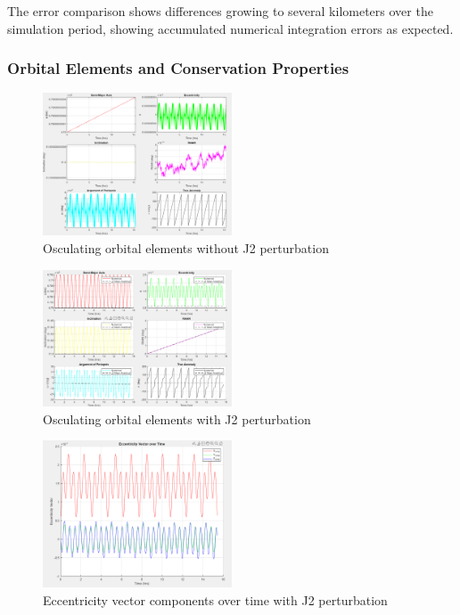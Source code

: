 The error comparison shows differences growing to several kilometers over the simulation period, showing accumulated numerical integration errors as expected.

\subsubsection{Orbital Elements and Conservation Properties}

\begin{figure}[H]
    \centering
    \includegraphics[width=0.5\textwidth]{PS1/Figures/orbital_elements_unperturbed.png}
    \caption{Osculating orbital elements without J2 perturbation}
    \label{fig:oe_unperturbed}
\end{figure}

\begin{figure}[H]
    \centering
    \includegraphics[width=0.5\textwidth]{PS1/Figures/orbital_elements_j2.png}
    \caption{Osculating orbital elements with J2 perturbation}
    \label{fig:oe_j2}
\end{figure}

\begin{figure}[H]
    \centering
    \includegraphics[width=0.5\textwidth]{PS1/Figures/eccentricity_vector_j2.png}
    \caption{Eccentricity vector components over time with J2 perturbation}
    \label{fig:ecc_vector}
\end{figure}


